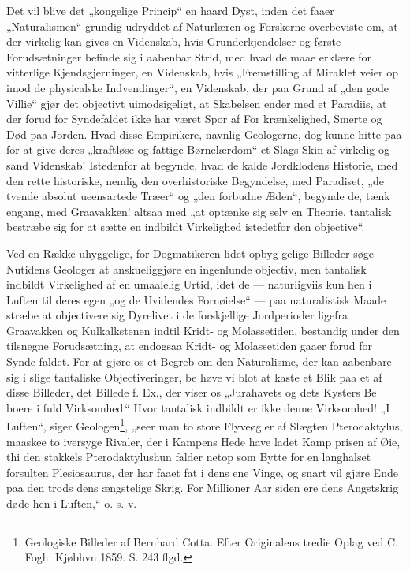 \documentclass[12pt]{book}
\newcommand{\opage}[1]{\marginnote{\footnotesize\textit{[#1]}}}
\begin{document}
Det vil blive det „kongelige Princip“ en haard Dyst, inden
det faaer „Naturalismen“ grundig udryddet af Naturlæren
og Forskerne overbeviste om, at der virkelig kan gives en
Videnskab, hvis Grunderkjendelser og første Forudsætninger
befinde sig i aabenbar Strid, med hvad de maae erklære for
vitterlige Kjendsgjerninger, en Videnskab, hvis „Fremstilling
af Miraklet veier op imod de physicalske Indvendinger“, en
Videnskab, der paa Grund af „den gode Villie“ gjør det
objectivt uimodsigeligt, at Skabelsen ender med et Paradiis,
at der forud for Syndefaldet ikke har været Spor af For\-%
krænkelighed, Smerte og Død paa Jorden. Hvad disse
Empirikere, navnlig Geologerne, dog kunne hitte paa for at
give deres „kraftløse og fattige Børnelærdom“ et Slags Skin
af virkelig og sand Videnskab! Istedenfor at begynde, hvad
de kalde Jordklodens Historie, med den rette historiske, nemlig
den overhistoriske Begyndelse, med Paradiset, „de tvende absolut
ueensartede Træer“ og „den forbudne Æden“, begynde de,
tænk engang, med Graavakken! altsaa med „at optænke sig
selv en Theorie, tantalisk bestræbe sig for at sætte en indbildt
Virkelighed istedetfor den objective“.

Ved en Række uhyggelige, for Dogmatikeren lidet opbyg\-%
gelige Billeder søge Nutidens Geologer at anskueliggjøre en
ingenlunde objectiv, men tantalisk indbildt Virkelighed af en
umaalelig Urtid, idet de --- naturligviis kun hen i Luften til
deres egen „og de Uvidendes Fornøielse“ --- paa naturalistisk
Maade stræbe at objectivere sig Dyrelivet i de forskjellige
Jordperioder ligefra Graavakken og Kulkalkstenen indtil Kridt- og
Molassetiden, bestandig under den tilsnegne Forudsætning,
\opage{22}\setcounter{footnote}{0}%
at endogsaa Kridt- og Molassetiden gaaer forud for Synde\-%
faldet. For at gjøre os et Begreb om den Naturalisme,
der kan aabenbare sig i slige tantaliske Objectiveringer, be\-%
høve vi blot at kaste et Blik paa et af disse Billeder, det
Billede f. Ex., der viser os „Jurahavets og dets Kysters Be\-%
boere i fuld Virksomhed.“ Hvor tantalisk indbildt er ikke
denne Virksomhed! „I Luften“, siger Geologen\footnote{Geologiske Billeder af Bernhard Cotta. Efter Originalens tredie
Oplag ved C. Fogh. Kjøbhvn 1859. S. 243 flgd.}, „seer
man to store Flyveøgler af Slægten Pterodaktylus, maaskee
to iversyge Rivaler, der i Kampens Hede have ladet Kamp\-%
prisen af Øie, thi den stakkels Pterodaktylushun falder netop
som Bytte for en langhalset forsulten Plesiosaurus, der har
faaet fat i dens ene Vinge, og snart vil gjøre Ende paa
den trods dens ængstelige Skrig. For Millioner Aar siden
ere dens Angstskrig døde hen i Luften,“ o. s. v.
\end{document}
